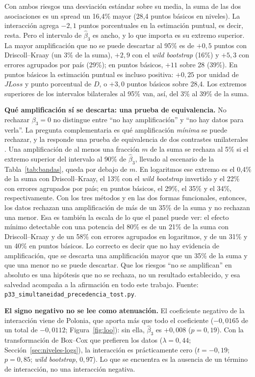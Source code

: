 Con ambos riesgos una desviación estándar sobre su media, la suma de las dos asociaciones es un spread un 16,4\% mayor (28,4 puntos básicos en niveles). La interacción agrega $-2{,}1$ puntos porcentuales en la estimación puntual, es decir, resta. Pero el intervalo de $\hat\beta_3$ es ancho, y lo que importa es su extremo superior. La mayor amplificación que no se puede descartar al 95\% es de $+0{,}5$ puntos con Driscoll--Kraay (un 3\% de la suma), $+2{,}9$ con el \textit{wild bootstrap} (16\%) y $+5{,}3$ con errores agrupados por país (29\%); en puntos básicos, $+11$ sobre 28 (39\%). En puntos básicos la estimación puntual es incluso positiva: $+0{,}25$ por unidad de $JLoss$ y punto porcentual de $D$, o $+3{,}0$ puntos básicos sobre 28,4. Los extremos superiores de los intervalos bilaterales al 95\% van, así, del 3\% al 39\% de la suma.

\textbf{Qué amplificación sí se descarta: una prueba de equivalencia.} No rechazar $\beta_3=0$ no distingue entre ``no hay amplificación'' y ``no hay datos para verla''. La pregunta complementaria es qué amplificación \emph{mínima} se puede rechazar, y la responde una prueba de equivalencia de dos contrastes unilaterales \citep[TOST;][]{Schuirmann1987}. Una amplificación de al menos una fracción $m$ de la suma se rechaza al 5\% si el extremo superior del intervalo al 90\% de $\hat\beta_3$, llevado al escenario de la Tabla~\ref{tab:bandas}, queda por debajo de $m$. En logaritmos ese extremo es el 0,4\% de la suma con Driscoll--Kraay, el 13\% con el \textit{wild bootstrap} invertido y el 22\% con errores agrupados por país; en puntos básicos, el 29\%, el 35\% y el 34\%, respectivamente. Con los tres métodos y en las dos formas funcionales, entonces, los datos rechazan una amplificación de más de un 35\% de la suma y no rechazan una menor. Esa es también la escala de lo que el panel puede ver: el efecto mínimo detectable con una potencia del 80\% es de un 21\% de la suma con Driscoll--Kraay y de un 58\% con errores agrupados en logaritmos, y de un 31\% y un 40\% en puntos básicos. Lo correcto es decir que no hay evidencia de amplificación, que se descarta una amplificación mayor que un 35\% de la suma y que una menor no se puede descartar. Que los riesgos ``no se amplifican'' en absoluto es una hipótesis que no se rechaza, no un resultado establecido, y esa salvedad acompaña a la afirmación en todo este trabajo. Fuente: \texttt{p33\_simultaneidad\_precedencia\_tost.py}.

\textbf{El signo negativo no se lee como atenuación.} El coeficiente negativo de la interacción viene de Polonia, que aporta más que todo el coeficiente ($-0{,}0165$ de un total de $-0{,}0112$; Figura~\ref{fig:loo}): sin ella, $\hat\beta_3$ es $+0{,}008$ ($p=0{,}19$). Con la transformación de Box--Cox que prefieren los datos ($\lambda=0{,}44$; Sección~\ref{sec:niveles-logs}), la interacción es prácticamente cero ($t=-0{,}19$; $p=0{,}85$; \textit{wild bootstrap}, $0{,}97$). Lo que se encuentra es la ausencia de un término de interacción, no una interacción negativa.


